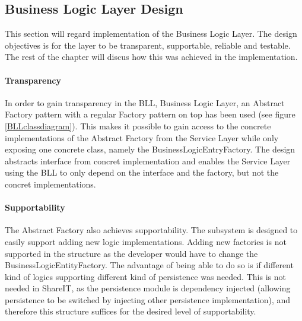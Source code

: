\documentclass[../report.tex]{subfiles}
\begin{document}
\graphicspath{{img/}{../img/}}

\subsection{Business Logic Layer Design}

This section will regard implementation of the Business Logic Layer. The design objectives is for the layer to be transparent, supportable, reliable and testable. The rest of the chapter will discus how this was achieved in the implementation. 

\paragraph{Transparency}
In order to gain transparency in the BLL, Business Logic Layer, an Abstract Factory pattern with a regular Factory pattern on top has been used (see figure \ref{BLLclassdiagram}). This makes it possible to gain access to the concrete implementations of the Abstract Factory from the Service Layer while only exposing one concrete class, namely the BusinessLogicEntryFactory. The design abstracts interface from concret implementation and enables the Service Layer using the BLL to only depend on the interface and the factory, but not the concret implementations.





\paragraph{Supportability} The Abstract Factory also achieves supportability.
The subsystem is designed to easily support adding new logic
implementations. Adding new factories is not supported in the structure as the
developer would have to change the BusinessLogicEntityFactory. The advantage
of being able to do so is if different kind of logics supporting different
kind of persistence was needed. This is not needed in ShareIT, as the
persistence module is dependency injected (allowing persistence to be switched
by injecting other persistence implementation), and therefore this structure
suffices for the desired level of supportability.
\end{document}

